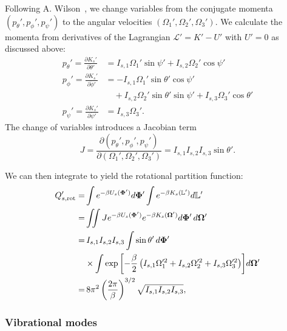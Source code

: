 \documentclass[pre, aps, twocolumn, reprint, amsmath,amssymb, showpacs,
superscriptaddress] {revtex4-1}
\begin{document}
Following A. Wilson~\cite{AWilson_1957}, we change variables from the
conjugate momenta $(p_\theta', p_\phi', p_\psi')$ to the angular
velocities $(\Omega_1', \Omega_2', \Omega_3')$. We calculate the
momenta from derivatives of the Lagrangian $\mathcal{L}'=K' - U'$ with
$U' = 0$ as discussed above:
\begin{equation}\label{COM-AngMomenta}
\begin{split}
  p_\theta' = \frac{\partial{K_s'}}{\partial{\dot{\theta}'}} &= I_{s, 1} \Omega_1' \sin{\psi'} + I_{s, 2} \Omega_2' \cos{\psi'}\\
  p_\phi' = \frac{\partial{K_s'}}{\partial{\dot{\phi}'}} &= -I_{s, 1} \Omega_1 '\sin{\theta'} \cos{\psi'} \\
  &\quad +I_{s, 2} \Omega_2' \sin{\theta'} \sin{\psi'} + I_{s, 3} \Omega_3' \cos{\theta'}\\
  p_\psi' = \frac{\partial{K_s'}}{\partial{\dot{\psi}'}} &= I_{s, 3}
  \Omega_3'.
\end{split}	
\end{equation}
The change of variables introduces a Jacobian term
\begin{equation*}
  J = \frac{\partial\left(p_\theta', p_\phi', p_\psi' \right) }{\partial \left(\Omega_1', \Omega_2', \Omega_3' \right) } = I_{s, 1} I_{s, 2} I_{s, 3} \sin{\theta'}.
\end{equation*}

We can then integrate to yield the rotational partition function:
\begin{equation}\label{COM-Rot Partition Function}
	\begin{split}
		Q_{s, \textnormal{rot}}' = &\int e^{-\beta U_s(\bm{\Phi}')} d\bm{\Phi}'  \int e^{-\beta K_s(\mathbb{L}')} d\mathbb{L}'\\
        = &\iint J e^{-\beta U_s(\bm{\Phi}')} e^{-\beta K_s(\bm{\Omega}')} d\bm{\Phi}' \, d\bm{\Omega}'\\
        = &\,I_{s, 1} I_{s, 2} I_{s, 3} \int \sin{\theta'}\, d\bm{\Phi}'\\
        &\times\int{ \exp{\left[ -\frac{\beta}{2} \left( I_{s, 1}\Omega_1'^2 + I_{s, 2}\Omega_2'^2 + I_{s, 3}\Omega_3'^2 \right)\right]}}  
        d \bm{\Omega}' \\
        = &\,8 \pi^2 \left( \frac{2\pi}{\beta} \right)^{3/2} \sqrt{I_{s, 1} I_{s, 2} I_{s, 3}},
    \end{split}
  \end{equation}
\subsubsection{Vibrational modes}
\end{document}
